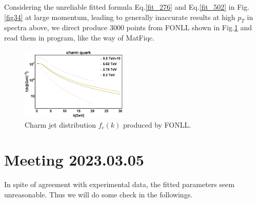 \documentclass[twocolumn,aps,superscriptaddress,nofootinbib,floatfix]{revtex4}
\begin{document}
Considering the unreliable fitted formula Eq.\ref{fit_276} and Eq.\ref{fit_502} in Fig.\ref{fig34} at large momentum, leading to generally inaccurate results at high $p_T$ in spectra above, we direct produce 3000 points from FONLL shown in Fig.\ref{fig64} and read them in program, like the way of MatFiqc.
\begin{figure}[H]
	\includegraphics[width=0.45\textwidth]{charmJet.png}
	\caption{Charm jet distribution $f_c(k)$ produced by FONLL. }
	\label{fig64}
\end{figure}

\section{Meeting 2023.03.05}
In spite of agreement with experimental data, the fitted parameters  seem unreasonable. Thus we will do some check in the followings.
\end{document}
